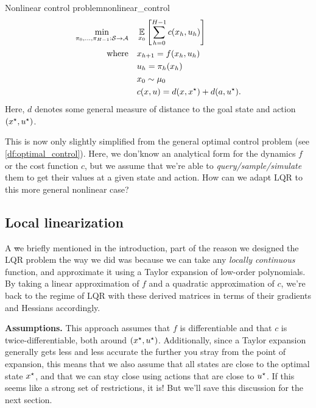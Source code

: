 \documentclass[../main/main]{subfiles}
\begin{document}
\begin{definition}{Nonlinear control problem}{nonlinear_control}
\begin{align*}
    \min_{\pi_0, \dots, \pi_{H-1} : \mathcal{S} \to \mathcal{A}} \quad & \operatorname*{\mathbb{E}}_{x_0} \left[ \sum_{h=0}^{H-1} c(x_h, u_h) \right] \\
    \text{where} \quad & x_{h+1} = f(x_h, u_h) \\
    & u_h = \pi_h(x_h) \\
    & x_0 \sim \mu_0 \\
    & c(x, u) = d(x, x^\star) + d(a, u^\star).
\end{align*}
Here, $d$ denotes some general measure of distance to the goal state and action $(x^\star, u^\star)$.
\end{definition}

This is now only slightly simplified from the general optimal control problem (see \ref{df:optimal_control}). Here, we don'\hi know an analytical form for the dynamics $f$ or the cost function $c$,
but we assume that we're able to \emph{query/sample/simulate} them
to get their values at a given state and action.
How can we adapt LQR to this more general nonlinear case?

\subsection{Local linearization}

A \st we briefly mentioned in the introduction, part of the reason we designed the LQR problem the way we did was because we can take any \emph{locally continuous} function, and approximate it using a Taylor expansion of low-order polynomials. By taking a linear approximation of $f$ and a quadratic approximation of $c$, we're back to the regime of LQR with these derived matrices in terms of their gradients and Hessians accordingly.

\textbf{Assumptions.} This approach assumes that $f$ is differentiable and that $c$ is twice-differentiable, both around $(x^\star, u^\star)$.
Additionally, since a Taylor expansion generally gets less and less accurate the further you stray from the point of expansion, this means that we also assume that all states are close to the optimal state $x^\star$,
and that we can stay close using actions that are close to $u^\star$.
If this seems like a strong set of restrictions, it is! But we'll save this discussion for the next section.
\end{document}
